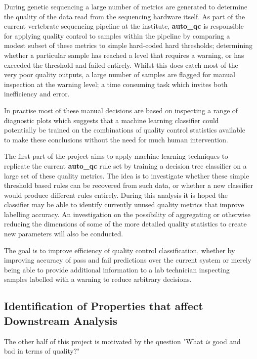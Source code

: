 During genetic sequencing a large number of metrics are generated to determine
the quality of the data read from the sequencing hardware itself. As part of the
current vertebrate sequencing pipeline\citep{vr-pipe:github} at the institute,
\textbf{auto\_qc} is responsible for applying quality control to samples within
the pipeline by comparing a modest subset of these metrics to simple hard-coded
hard thresholds; determining whether a particular sample has reached a level that
requires a warning, or has exceeded the threshold and failed entirely. Whilst
this does catch most of the very poor quality outputs, a large number of samples
are flagged for manual inspection at the warning level; a time consuming task
which invites both inefficiency and error.

In practise most of these manual decisions are based on inspecting a range of
diagnostic plots which suggests that a machine learning classifier could
potentially be trained on the combinations of quality control statistics
available to make these conclusions without the need for much human
intervention.

The first part of the project aims to apply machine learning techniques to
replicate the current \textbf{auto\_qc} rule set by training a decision tree
classifier on a large set of these quality metrics. The idea is to investigate
whether these simple threshold based rules can be recovered from such data, or
whether a new classifier would produce different rules entirely. During this
analysis it is hoped the classifier may be able to identify currently unused
quality metrics that improve labelling accuracy. An investigation on the
possibility of aggregating or otherwise reducing the dimensions of some of the
more detailed quality statistics to create new parameters will also be
conducted.

The goal is to improve efficiency of quality control classification, whether by
improving accuracy of pass and fail predictions over the current system or
merely being able to provide additional information to a lab technician
inspecting samples labelled with a warning to reduce arbitrary decisions.

\subsection{Identification of Properties that affect Downstream Analysis}

The other half of this project is motivated by the question "What \textit{is}
good and bad in terms of quality?"

